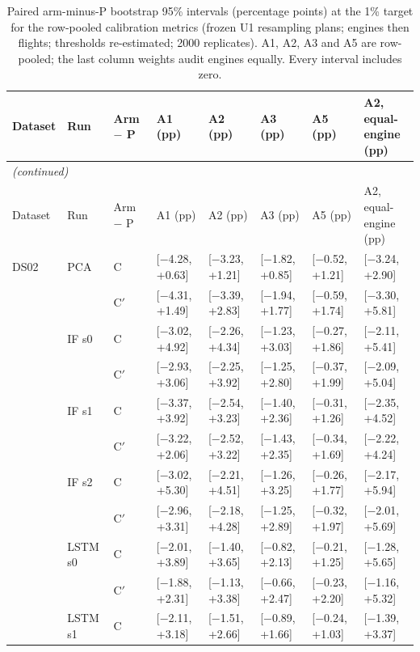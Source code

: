 \begin{scriptsize}
\begin{longtable}{llllllll}
\caption{Paired arm-minus-P bootstrap 95\% intervals (percentage points) at the 1\% target for the row-pooled calibration metrics (frozen U1 resampling plans; engines then flights; thresholds re-estimated; 2000 replicates). A1, A2, A3 and A5 are row-pooled; the last column weights audit engines equally. Every interval includes zero.}\label{tab:s9_intervals}\\
\toprule
Dataset & Run & Arm $-$ P & A1 (pp) & A2 (pp) & A3 (pp) & A5 (pp) & \makecell{A2, equal-\\engine (pp)} \\
\midrule
\endfirsthead
\multicolumn{8}{l}{\emph{(continued)}}\\
\toprule
Dataset & Run & Arm $-$ P & A1 (pp) & A2 (pp) & A3 (pp) & A5 (pp) & \makecell{A2, equal-\\engine (pp)} \\
\midrule
\endhead
\bottomrule
\endfoot
DS02 & PCA & C & [$-$4.28, +0.63] & [$-$3.23, +1.21] & [$-$1.82, +0.85] & [$-$0.52, +1.21] & [$-$3.24, +2.90] \\
 &  & C$'$ & [$-$4.31, +1.49] & [$-$3.39, +2.83] & [$-$1.94, +1.77] & [$-$0.59, +1.74] & [$-$3.30, +5.81] \\
 & IF s0 & C & [$-$3.02, +4.92] & [$-$2.26, +4.34] & [$-$1.23, +3.03] & [$-$0.27, +1.86] & [$-$2.11, +5.41] \\
 &  & C$'$ & [$-$2.93, +3.06] & [$-$2.25, +3.92] & [$-$1.25, +2.80] & [$-$0.37, +1.99] & [$-$2.09, +5.04] \\
 & IF s1 & C & [$-$3.37, +3.92] & [$-$2.54, +3.23] & [$-$1.40, +2.36] & [$-$0.31, +1.26] & [$-$2.35, +4.52] \\
 &  & C$'$ & [$-$3.22, +2.06] & [$-$2.52, +3.22] & [$-$1.43, +2.35] & [$-$0.34, +1.69] & [$-$2.22, +4.24] \\
 & IF s2 & C & [$-$3.02, +5.30] & [$-$2.21, +4.51] & [$-$1.26, +3.25] & [$-$0.26, +1.77] & [$-$2.17, +5.94] \\
 &  & C$'$ & [$-$2.96, +3.31] & [$-$2.18, +4.28] & [$-$1.25, +2.89] & [$-$0.32, +1.97] & [$-$2.01, +5.69] \\
 & LSTM s0 & C & [$-$2.01, +3.89] & [$-$1.40, +3.65] & [$-$0.82, +2.13] & [$-$0.21, +1.25] & [$-$1.28, +5.65] \\
 &  & C$'$ & [$-$1.88, +2.31] & [$-$1.13, +3.38] & [$-$0.66, +2.47] & [$-$0.23, +2.20] & [$-$1.16, +5.32] \\
 & LSTM s1 & C & [$-$2.11, +3.18] & [$-$1.51, +2.66] & [$-$0.89, +1.66] & [$-$0.24, +1.03] & [$-$1.39, +3.37] \\

\end{longtable}
\end{scriptsize}
